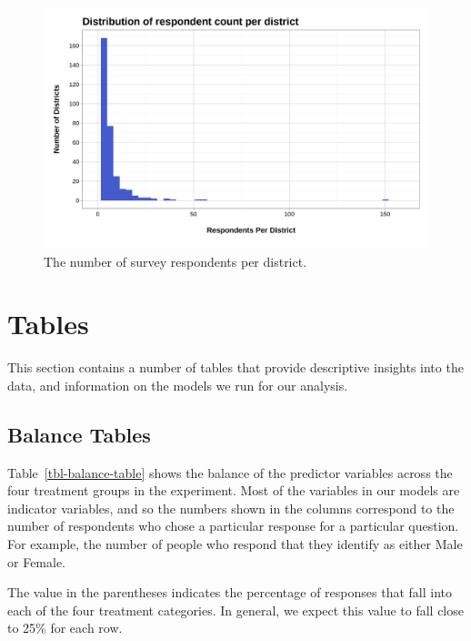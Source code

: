 \documentclass[
  10,
  letterpaper,
  DIV=11,
  numbers=noendperiod]{scrartcl}
\begin{document}
\begin{figure}

{\centering \includegraphics{../Figures/distribution-responses-district.png}

}

\caption{\label{fig-respondents-district}The number of survey
respondents per district.}

\end{figure}

\hypertarget{tables}{%
\section{Tables}\label{tables}}

This section contains a number of tables that provide descriptive
insights into the data, and information on the models we run for our
analysis.

\hypertarget{balance-tables}{%
\subsection{Balance Tables}\label{balance-tables}}

Table~\ref{tbl-balance-table} shows the balance of the predictor
variables across the four treatment groups in the experiment. Most of
the variables in our models are indicator variables, and so the numbers
shown in the columns correspond to the number of respondents who chose a
particular response for a particular question. For example, the number
of people who respond that they identify as either Male or Female.

The value in the parentheses indicates the percentage of responses that
fall into each of the four treatment categories. In general, we expect
this value to fall close to 25\% for each row.
\end{document}
